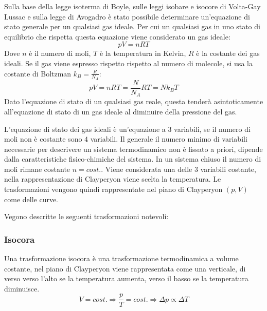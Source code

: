 \documentclass{article}
\numberwithin{equation}{subsection}
\begin{document}
Sulla base della legge isoterma di Boyle, sulle leggi isobare e isocore di Volta-Gay Lussac e sulla legge di Avogadro è stato possibile determinare un'equazione di stato 
generale per un qualsiasi gas ideale. Per cui un qualsiasi gas in uno stato di equilibrio che rispetta questa equazione viene considerato un gas ideale: 
\begin{equation}
    pV=nRT
\end{equation}
Dove $n$ è il numero di moli, $T$ è la temperatura in Kelvin, 
$R$ è la costante dei gas ideali. Se il gas viene espresso 
rispetto rispetto al numero di molecole, si usa la costante di 
Boltzman $k_B=\displaystyle\frac{R}{N_A}$:
\begin{equation*}
    pV=nRT=\displaystyle\frac{N}{N_A}RT=Nk_BT
\end{equation*} 
Dato l'equazione di stato di un qualsiasi gas reale, questa tenderà asintoticamente all'equazione di stato di un gas ideale al diminuire della pressione del gas. 



L'equazione di stato dei gas ideali è un'equazione a $3$ 
variabili, se il numero di moli non è costante sono $4$ 
variabili. Il generale il numero minimo di variabili necessarie per descrivere un sistema termodinamico non è fissato a priori, dipende dalla caratteristiche 
fisico-chimiche del sistema. In un sistema chiuso il numero di moli 
rimane costante $n=cost.$. Viene considerata una delle $3$ variabili 
costante, nella rappresentazione di Clayperyon viene scelta 
la temperatura. Le trasformazioni vengono quindi rappresentate 
nel piano di Clayperyon $(p,V)$ come delle curve.  



Vegono descritte le seguenti trasformazioni notevoli:
\subsubsection{Isocora}
Una trasformazione isocora è una trasformazione termodinamica 
a volume costante, nel piano di Clayperyon viene rappresentata 
come una verticale, di verso verso l'alto se la temperatura 
aumenta, verso il basso se la temperatura diminuisce. 
\begin{equation*}
    V=cost.\Rightarrow
    \displaystyle\frac{p}{T}=cost.\Rightarrow
    \Delta p \propto\Delta T
\end{equation*}

\begin{center}\end{center}
\end{document}

